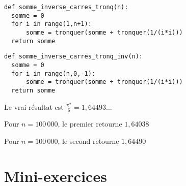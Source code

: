 \begin{frame}[fragile]

\begin{algo}[reels.py (2)]
\begin{lstlisting}
def somme_inverse_carres_tronq(n):
  somme = 0
  for i in range(1,n+1):
      somme = tronquer(somme + tronquer(1/(i*i)))
  return somme
\end{lstlisting}  
\end{algo}

\pause

\begin{algo}[reels.py (3)]
\begin{lstlisting}
def somme_inverse_carres_tronq_inv(n):
  somme = 0
  for i in range(n,0,-1):
      somme = tronquer(somme + tronquer(1/(i*i)))
  return somme
\end{lstlisting}  
\end{algo}

\pause

Le vrai résultat est $\frac{\pi^2}{6}=1,64493\ldots$ 

\pause

Pour $n = 100\, 000$, le premier retourne $1,64038$ 

\pause

Pour $n = 100\, 000$, le second retourne $1,64490$

\end{frame}



\section{Mini-exercices}

